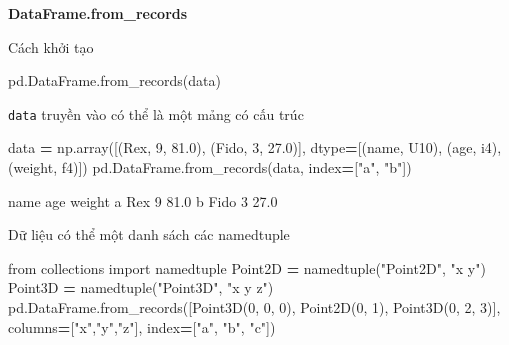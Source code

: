\documentclass[
]{book}
\newenvironment{Shaded}{\begin{snugshade}}{\end{snugshade}}
\newcommand{\DecValTok}[1]{\textcolor[rgb]{0.00,0.00,0.81}{#1}}
\newcommand{\FloatTok}[1]{\textcolor[rgb]{0.00,0.00,0.81}{#1}}
\newcommand{\ImportTok}[1]{#1}
\newcommand{\NormalTok}[1]{#1}
\newcommand{\OperatorTok}[1]{\textcolor[rgb]{0.81,0.36,0.00}{\textbf{#1}}}
\newcommand{\StringTok}[1]{\textcolor[rgb]{0.31,0.60,0.02}{#1}}
\begin{document}
\textbf{DataFrame.from\_records}

Cách khởi tạo

\begin{Shaded}
\begin{Highlighting}[]
\NormalTok{pd.DataFrame.from\_records(data)}
\end{Highlighting}
\end{Shaded}

\texttt{data} truyền vào có thể là một mảng có cấu trúc

\begin{Shaded}
\begin{Highlighting}[]
\NormalTok{data }\OperatorTok{=}\NormalTok{ np.array([(}\StringTok{\textquotesingle{}Rex\textquotesingle{}}\NormalTok{, }\DecValTok{9}\NormalTok{, }\FloatTok{81.0}\NormalTok{), (}\StringTok{\textquotesingle{}Fido\textquotesingle{}}\NormalTok{, }\DecValTok{3}\NormalTok{, }\FloatTok{27.0}\NormalTok{)],}
\NormalTok{                        dtype}\OperatorTok{=}\NormalTok{[(}\StringTok{\textquotesingle{}name\textquotesingle{}}\NormalTok{, }\StringTok{\textquotesingle{}U10\textquotesingle{}}\NormalTok{), (}\StringTok{\textquotesingle{}age\textquotesingle{}}\NormalTok{, }\StringTok{\textquotesingle{}i4\textquotesingle{}}\NormalTok{), (}\StringTok{\textquotesingle{}weight\textquotesingle{}}\NormalTok{, }\StringTok{\textquotesingle{}f4\textquotesingle{}}\NormalTok{)])}
\NormalTok{pd.DataFrame.from\_records(data, index}\OperatorTok{=}\NormalTok{[}\StringTok{"a"}\NormalTok{, }\StringTok{"b"}\NormalTok{])}
\end{Highlighting}
\end{Shaded}

\begin{Shaded}
\begin{Highlighting}[]
\NormalTok{   name  age  weight}
\NormalTok{a   Rex    9    81.0}
\NormalTok{b  Fido    3    27.0}
\end{Highlighting}
\end{Shaded}

Dữ liệu có thể một danh sách các namedtuple

\begin{Shaded}
\begin{Highlighting}[]
\ImportTok{from}\NormalTok{ collections }\ImportTok{import}\NormalTok{ namedtuple}
\NormalTok{Point2D }\OperatorTok{=}\NormalTok{ namedtuple(}\StringTok{"Point2D"}\NormalTok{, }\StringTok{"x y"}\NormalTok{)}
\NormalTok{Point3D }\OperatorTok{=}\NormalTok{ namedtuple(}\StringTok{"Point3D"}\NormalTok{, }\StringTok{"x y z"}\NormalTok{)}
\NormalTok{pd.DataFrame.from\_records([Point3D(}\DecValTok{0}\NormalTok{, }\DecValTok{0}\NormalTok{, }\DecValTok{0}\NormalTok{), Point2D(}\DecValTok{0}\NormalTok{, }\DecValTok{1}\NormalTok{), Point3D(}\DecValTok{0}\NormalTok{, }\DecValTok{2}\NormalTok{, }\DecValTok{3}\NormalTok{)],}
\NormalTok{                          columns}\OperatorTok{=}\NormalTok{[}\StringTok{"x"}\NormalTok{,}\StringTok{"y"}\NormalTok{,}\StringTok{"z"}\NormalTok{], index}\OperatorTok{=}\NormalTok{[}\StringTok{"a"}\NormalTok{, }\StringTok{"b"}\NormalTok{, }\StringTok{"c"}\NormalTok{])}
\end{Highlighting}
\end{Shaded}
\end{document}
